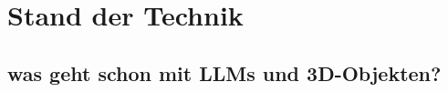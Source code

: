 \chapter{Stand der Technik}\label{ch:stand_der_technik}

\section{was geht schon mit LLMs und 3D-Objekten?}